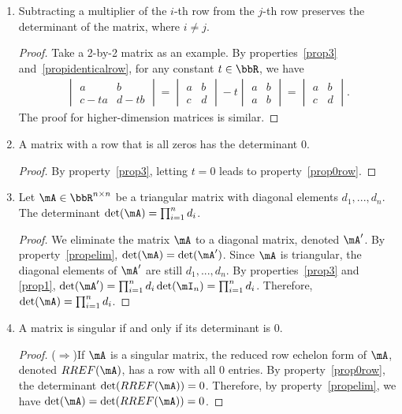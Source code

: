 \documentclass[11pt]{article}
\theoremstyle{plain}
\theoremstyle{definition}
\begin{document}
\begin{enumerate}
	\item \label{propelim} Subtracting a multiplier of the $i$-th row from the $j$-th row preserves the determinant of the matrix, where $i \neq j$.
	\begin{proof}
		Take a 2-by-2 matrix as an example. By properties~\ref{prop3} and~\ref{propidenticalrow}, for any constant $t \in \bbR$, we have 
	\begin{align}
		 \begin{vmatrix}
			a & b \\ c - ta&d -tb
		\end{vmatrix} = \begin{vmatrix}
			a & b \\ c &d
		\end{vmatrix} -t \begin{vmatrix}
			a & b \\ a& b
		\end{vmatrix}  = \begin{vmatrix}
			a & b \\ c &d
		\end{vmatrix}.
	\end{align}
	The proof for higher-dimension matrices is similar.
	\end{proof}
	
	\item\label{prop0row} A matrix with a row that is all zeros has the determinant 0.
	\begin{proof}
		By property~\ref{prop3}, letting $t = 0$ leads to property~\ref{prop0row}.
	\end{proof}

	
	\item\label{propdiag} Let $\mA \in \bbR^{n \times n}$ be a triangular matrix with diagonal elements $d_1,...,d_n$. The determinant $\det(\mA) = \prod_{i = 1}^n d_i$. 
	\begin{proof}
	We eliminate the matrix $\mA$ to a diagonal matrix, denoted $\mA'$. By property~\ref{propelim}, $\det(\mA) = \det(\mA')$. Since $\mA$ is triangular, the diagonal elements of $\mA'$ are still $d_1,...,d_n$.
 		 By properties~\ref{prop3} and \ref{prop1}, $\det(\mA') = \prod_{i = 1}^n d_i\det(\mI_n) =\prod_{i = 1}^n d_i$. Therefore, $\det(\mA) = \prod_{i = 1}^n d_i$.
	\end{proof}

	
	\item\label{propsingular} A matrix is singular if and only if its determinant is  0.
	
	\begin{proof}
		($\Rightarrow$)If $\mA$ is a singular matrix, the reduced row echelon form of $\mA$, denoted $RREF(\mA)$, has a row with all 0 entries. By property~\ref{prop0row}, the determinant $\det(RREF(\mA)) = 0$. Therefore, by property~\ref{propelim}, we have $\det(\mA) =\det(RREF(\mA)) =  0$. 
		

\end{proof}
\end{enumerate}
\end{document}
